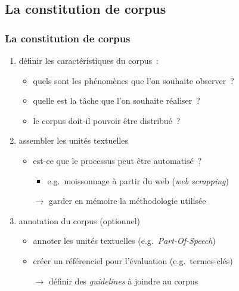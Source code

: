 \subsection{La constitution de corpus}


\begin{frame}
\frametitle{La constitution de corpus}

\begin{enumerate} \itemsep0.8em

    \item définir les caractéristiques du corpus~:
    \begin{itemize}
        \item quels sont les phénomènes que l'on souhaite observer~?
        \item quelle est la tâche que l'on souhaite réaliser~?
        \item le corpus doit-il pouvoir être distribué~?
    \end{itemize} 

    \item assembler les unités textuelles
    \begin{itemize}
        \item est-ce que le processus peut être automatisé~?
        \begin{itemize}
            \item e.g.~moissonnage à partir du web (\textit{web scrapping})
        \end{itemize}
        \item[$\to$] garder en mémoire la méthodologie utilisée
    \end{itemize}

    \item annotation du corpus (optionnel)
    \begin{itemize}
        \item annoter les unités textuelles (e.g.~\textit{Part-Of-Speech})
        \item créer un référenciel pour l'évaluation (e.g.~termes-clés)
        \item[$\to$] définir des \textit{guidelines} à joindre au corpus
    \end{itemize}

\end{enumerate}

\end{frame}

